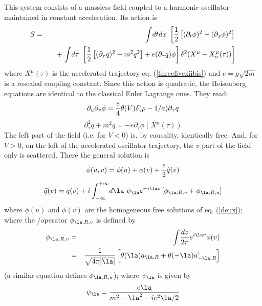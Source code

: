 \documentclass[12pt]{article}
\begin{document}
This system consists
of a massless field coupled to
a harmonic oscillator maintained in constant acceleration. Its action is
\begin{eqnarray}
S &=&\int\! dt dx\ \left[ {1 \over 2} \left[ ( \partial_t \phi)^2
- ( \partial_x \phi)^2  \right] \right.
\nonumber\\
&&\quad + \left.
 \int\! d\tau\   \left[ { 1 \over 2} \left[ ( \partial_{ \tau} q)^2 - m ^2
q^2  \right] + e( \partial_{ \tau} q)  \phi  \right]
\delta ^2 (X^{\mu } -X^{\mu
}_a (\tau ))\right]
\label{un}
\end{eqnarray}
where $X^{\mu } (\tau )$ is the accelerated trajectory
eq. (\ref{threefivexiibis}) and $e= g \sqrt{2 m}$ is a rescaled coupling
constant. Since this action is quadratic, the Heisenberg equations are
identical to the classical Euler Lagrange ones. They read:
\begin{equation}
 \partial_u  \partial_v  \phi = {e \over 4 } \theta(V) \delta
( \rho - 1/a)  \partial_{ \tau} q
\label{deux}
\end{equation}
\begin{equation}
\partial_{ \tau} ^2 q +  m ^2
q = - e \partial_{ \tau}  \phi(X^{\mu } (\tau ))
\label{trois}
\end{equation}
The left part of the field (i.e. for $V<0$)
is, by causality, identically free.
And, for $V>0$, on the left of the
accelerated oscillator trajectory, the $v$-part of the field only is
scattered. There the general solution is
\begin{equation}
\tilde \phi (u,v) = \phi (u) + \phi (v) + {e\over 2 } \tilde q(v)
\label{quatre}
\end{equation}
\begin{equation}
\tilde q(v)= q(v) + i  \int _{-\infty}^{+\infty} \! d\la\
 \psi_{ \la} e^{-i \la v}
 \left[ \phi _{ \la,R,v} + \phi _{ \la,R,u} \right]
\label{cinq}
\end{equation}
where $ \phi (u)$ and $ \phi (v)$ are the
homogeneous free solutions of  eq. (\ref{deux}); where the
/operator $ \phi _{ \la,R,v}$ is defined by
\begin{eqnarray}
 \phi _{ \la,R,v} &=&  \int\! {dv \over 2 \pi } e^{i \la v}  \phi (v)
\nonumber\\ &=& {1  \over \sqrt{4 \pi | \la |}}  \left[ \theta ( \la)
a_{\la,R} +  \theta (- \la) a_{- \la,R}^\dagger  \right]
\label{six}
\end{eqnarray}
(a similar equation defines $ \phi _{ \la,R,u}$);
where $ \psi _{ \la}$ is given by
\begin{equation}
\psi _{ \la} = { e\la \over  m ^2 -  \la ^2 -i e^2  \la /2}
\label{sept}
\end{equation}
\end{document}
